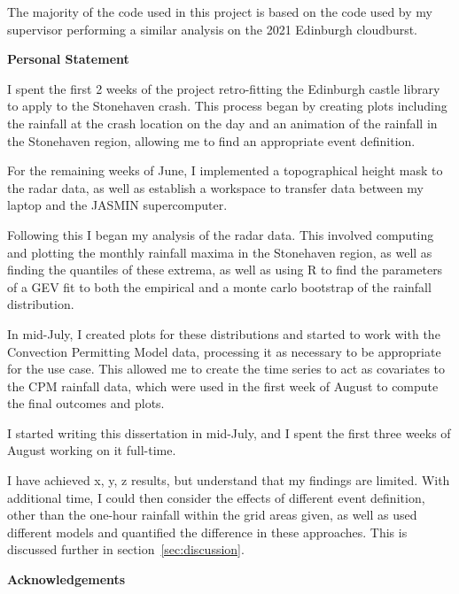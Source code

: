 \documentclass[12pt,a4paper]{report}
\begin{document}
The majority of the code used in this project is based on the code used by my supervisor performing a similar analysis on the 2021 Edinburgh cloudburst.


\newpage

\begin{center}
\textbf{Personal Statement} %
\end{center}

I spent the first 2 weeks of the project retro-fitting the Edinburgh castle
library to apply to the Stonehaven crash.
This process began by creating plots including the
rainfall at the crash location on the day and an animation of the rainfall
in the Stonehaven region, allowing me to find an appropriate event definition.

For the remaining weeks of June, I implemented a topographical height mask
to the radar data, as well as establish a workspace to transfer data between
my laptop and the JASMIN supercomputer.

Following this I began my analysis of the radar data.
This involved computing and plotting the monthly rainfall maxima in
the Stonehaven region, as well as finding the quantiles of these extrema,
as well as using R to find the parameters of a GEV fit to both the empirical
and a monte carlo bootstrap of the rainfall distribution.

In mid-July, I created plots for these distributions and started to work with the Convection Permitting Model data,
    processing it as necessary to be appropriate for the use case.
This allowed me to create the time series to act as covariates to the CPM rainfall data,
    which were used in the first week of August to compute the final outcomes and plots.


I started writing this dissertation in mid-July, and I spent the first
three weeks of August working on it full-time.

I have achieved x, y, z results, but understand that my findings are limited.
With additional time,
    I could then consider the effects of different event definition,
    other than the one-hour rainfall within the grid areas given,
    as well as used different models and quantified the difference in these approaches.
This is discussed further in section~\ref{sec:discussion}.


\newpage

\begin{center}
\textbf{Acknowledgements}
\end{center}
\end{document}
